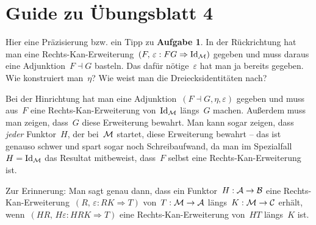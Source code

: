 \documentclass{uebblatt}
\begin{document}
\section*{Guide zu Übungsblatt 4}

Hier eine Präzisierung bzw. ein Tipp zu \textbf{Aufgabe 1}. In der Rückrichtung
hat man eine Rechts-Kan-Erweiterung~$(F,\,\varepsilon : F G \Rightarrow \mathrm{Id}_{\mathcal{M}})$
gegeben und muss daraus eine Adjunktion~$F \dashv G$ basteln. Das dafür
nötige~$\varepsilon$ hat man ja bereits gegeben. Wie konstruiert man~$\eta$?
Wie weist man die Dreiecksidentitäten nach?

Bei der Hinrichtung hat man eine Adjunktion~$(F \dashv G, \eta, \varepsilon)$
gegeben und muss aus~$F$ eine Rechts-Kan-Erweiterung von~$\mathrm{Id}_{\mathcal{M}}$ längs~$G$
machen. Außerdem muss man zeigen, dass~$G$ diese Erweiterung bewahrt. Man kann
sogar zeigen, dass \emph{jeder} Funktor~$H$, der bei~$\mathcal{M}$ startet, diese
Erweiterung bewahrt -- das ist genauso schwer und spart sogar noch
Schreibaufwand, da man im Spezialfall~$H = \mathrm{Id}_{\mathcal{M}}$ das Resultat mitbeweist,
dass~$F$ selbst eine Rechts-Kan-Erweiterung ist.

Zur Erinnerung: Man sagt genau dann, dass ein Funktor~$H : \mathcal{A} \to \mathcal{B}$ eine
Rechts-Kan-Erweiterung~$(R,\,\varepsilon : RK \Rightarrow T)$ von~$T : \mathcal{M} \to
\mathcal{A}$ längs~$K : \mathcal{M} \to \mathcal{C}$ erhält, wenn~$(HR,\,H\varepsilon : HRK \Rightarrow
T)$ eine Rechts-Kan-Erweiterung von~$HT$ längs~$K$ ist.
\end{document}
